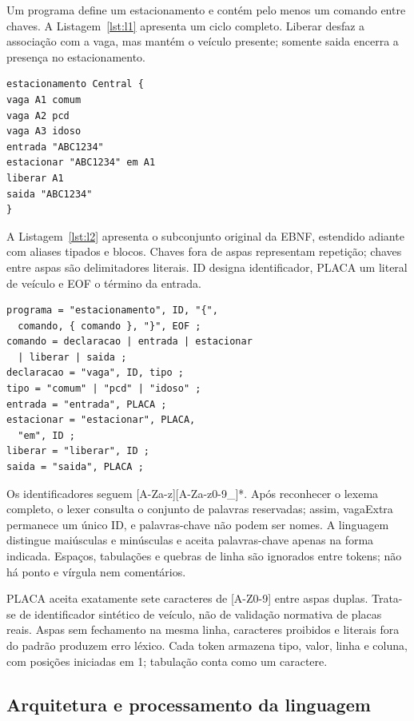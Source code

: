 \documentclass[conference,a4paper]{IEEEtran}
\begin{document}
Um programa define um estacionamento e contém pelo menos um comando entre chaves. A Listagem~\ref{lst:l1} apresenta um ciclo completo. Liberar desfaz a associação com a vaga, mas mantém o veículo presente; somente saida encerra a presença no estacionamento.


\begin{lstlisting}[caption={Programa válido utilizado na avaliação.},label={lst:l1}]
estacionamento Central {
vaga A1 comum
vaga A2 pcd
vaga A3 idoso
entrada "ABC1234"
estacionar "ABC1234" em A1
liberar A1
saida "ABC1234"
}
\end{lstlisting}

A Listagem~\ref{lst:l2} apresenta o subconjunto original da EBNF, estendido adiante com aliases tipados e blocos. Chaves fora de aspas representam repetição; chaves entre aspas são delimitadores literais. ID designa identificador, PLACA um literal de veículo e EOF o término da entrada.


\begin{lstlisting}[caption={Subconjunto original da gramática em EBNF.},label={lst:l2}]
programa = "estacionamento", ID, "{",
  comando, { comando }, "}", EOF ;
comando = declaracao | entrada | estacionar
  | liberar | saida ;
declaracao = "vaga", ID, tipo ;
tipo = "comum" | "pcd" | "idoso" ;
entrada = "entrada", PLACA ;
estacionar = "estacionar", PLACA,
  "em", ID ;
liberar = "liberar", ID ;
saida = "saida", PLACA ;
\end{lstlisting}

Os identificadores seguem [A-Za-z][A-Za-z0-9\_]*. Após reconhecer o lexema completo, o lexer consulta o conjunto de palavras reservadas; assim, vagaExtra permanece um único ID, e palavras-chave não podem ser nomes. A linguagem distingue maiúsculas e minúsculas e aceita palavras-chave apenas na forma indicada. Espaços, tabulações e quebras de linha são ignorados entre tokens; não há ponto e vírgula nem comentários.


PLACA aceita exatamente sete caracteres de [A-Z0-9] entre aspas duplas. Trata-se de identificador sintético de veículo, não de validação normativa de placas reais. Aspas sem fechamento na mesma linha, caracteres proibidos e literais fora do padrão produzem erro léxico. Cada token armazena tipo, valor, linha e coluna, com posições iniciadas em 1; tabulação conta como um caractere.


\subsection{Arquitetura e processamento da linguagem}
\end{document}
